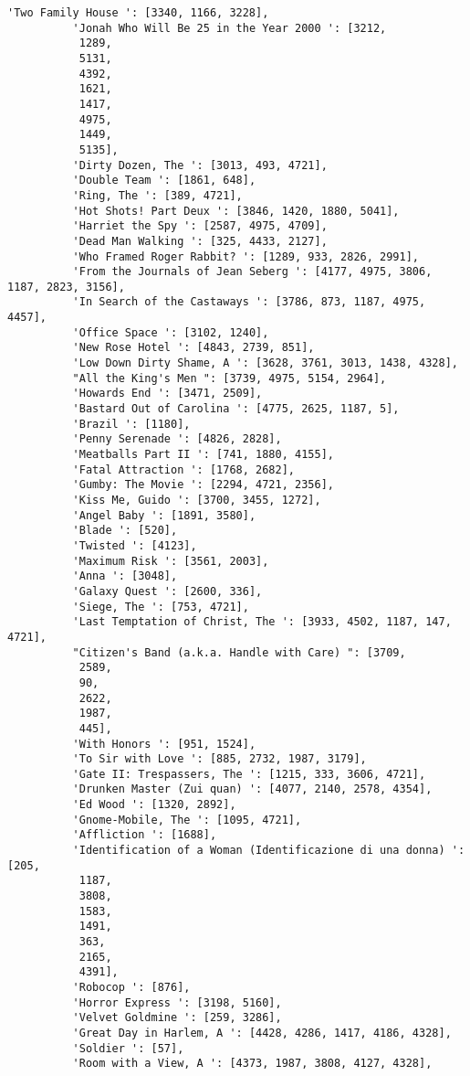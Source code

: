 \documentclass[11pt]{article}
\begin{document}
\begin{Verbatim}[commandchars=\\\{\}]
          'Two Family House ': [3340, 1166, 3228],
          'Jonah Who Will Be 25 in the Year 2000 ': [3212,
           1289,
           5131,
           4392,
           1621,
           1417,
           4975,
           1449,
           5135],
          'Dirty Dozen, The ': [3013, 493, 4721],
          'Double Team ': [1861, 648],
          'Ring, The ': [389, 4721],
          'Hot Shots! Part Deux ': [3846, 1420, 1880, 5041],
          'Harriet the Spy ': [2587, 4975, 4709],
          'Dead Man Walking ': [325, 4433, 2127],
          'Who Framed Roger Rabbit? ': [1289, 933, 2826, 2991],
          'From the Journals of Jean Seberg ': [4177, 4975, 3806, 1187, 2823, 3156],
          'In Search of the Castaways ': [3786, 873, 1187, 4975, 4457],
          'Office Space ': [3102, 1240],
          'New Rose Hotel ': [4843, 2739, 851],
          'Low Down Dirty Shame, A ': [3628, 3761, 3013, 1438, 4328],
          "All the King's Men ": [3739, 4975, 5154, 2964],
          'Howards End ': [3471, 2509],
          'Bastard Out of Carolina ': [4775, 2625, 1187, 5],
          'Brazil ': [1180],
          'Penny Serenade ': [4826, 2828],
          'Meatballs Part II ': [741, 1880, 4155],
          'Fatal Attraction ': [1768, 2682],
          'Gumby: The Movie ': [2294, 4721, 2356],
          'Kiss Me, Guido ': [3700, 3455, 1272],
          'Angel Baby ': [1891, 3580],
          'Blade ': [520],
          'Twisted ': [4123],
          'Maximum Risk ': [3561, 2003],
          'Anna ': [3048],
          'Galaxy Quest ': [2600, 336],
          'Siege, The ': [753, 4721],
          'Last Temptation of Christ, The ': [3933, 4502, 1187, 147, 4721],
          "Citizen's Band (a.k.a. Handle with Care) ": [3709,
           2589,
           90,
           2622,
           1987,
           445],
          'With Honors ': [951, 1524],
          'To Sir with Love ': [885, 2732, 1987, 3179],
          'Gate II: Trespassers, The ': [1215, 333, 3606, 4721],
          'Drunken Master (Zui quan) ': [4077, 2140, 2578, 4354],
          'Ed Wood ': [1320, 2892],
          'Gnome-Mobile, The ': [1095, 4721],
          'Affliction ': [1688],
          'Identification of a Woman (Identificazione di una donna) ': [205,
           1187,
           3808,
           1583,
           1491,
           363,
           2165,
           4391],
          'Robocop ': [876],
          'Horror Express ': [3198, 5160],
          'Velvet Goldmine ': [259, 3286],
          'Great Day in Harlem, A ': [4428, 4286, 1417, 4186, 4328],
          'Soldier ': [57],
          'Room with a View, A ': [4373, 1987, 3808, 4127, 4328],

\end{Verbatim}
\end{document}
